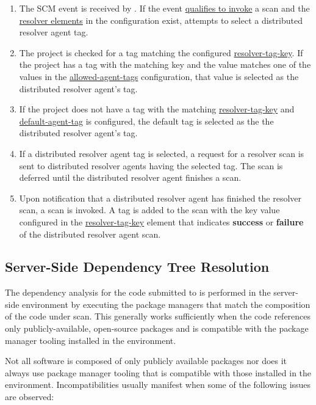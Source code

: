 \begin{enumerate}
  \item The SCM event is received by \cxoneflow.  If the event \hyperref[sec:overview]{qualifies to invoke} a scan and
    the \hyperref[sec:resolver-elements]{resolver elements} in the \cxoneflow configuration exist, \cxoneflow attempts to select
    a distributed resolver agent tag. 
  \item The \cxone project is checked for a tag matching the configured \hyperref[sec:yaml-resolver-resolver-tag-key]{resolver-tag-key}.
    If the project has a tag with the matching key and the value matches one of the values in the \hyperref[sec:yaml-resolver-allowed-agent-tags]{allowed-agent-tags}
    configuration, that value is selected as the distributed resolver agent's tag.
  \item If the \cxone project does not have a tag with the matching \hyperref[sec:yaml-resolver-resolver-tag-key]{resolver-tag-key} and
    \hyperref[sec:yaml-resolver-default-agent-tag]{default-agent-tag} is configured, the default tag is selected as the the distributed resolver agent's tag.
  \item If a distributed resolver agent tag is selected, a request for a resolver scan is sent to distributed resolver agents having the selected tag.  The
    \cxone scan is deferred until the distributed resolver agent finishes a scan.
  \item Upon notification that a distributed resolver agent has finished the resolver scan, a \cxone scan is invoked.  A tag is added to the scan
    with the key value configured in the \hyperref[sec:yaml-resolver-resolver-tag-key]{resolver-tag-key} element that indicates \textbf{success} or
    \textbf{failure} of the distributed resolver agent scan.
\end{enumerate}


\subsection{Server-Side Dependency Tree Resolution}

The dependency analysis for the code submitted to \cxone is performed
in the server-side \cxone environment by executing the package managers that match the composition of the code
under scan.  This generally works sufficiently when the code references only publicly-available, open-source
packages and is compatible with the package manager tooling installed in the \cxone environment.  

Not all software is composed of only publicly available packages nor does it always use package manager tooling
that is compatible with those installed in the \cxone environment.  Incompatibilities usually manifest
when some of the following issues are observed:

